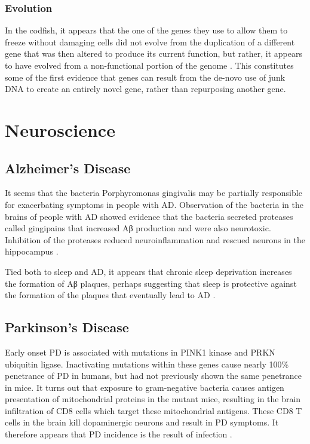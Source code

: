 \documentclass[]{book}
\begin{document}
\subsection{Evolution}\label{evolution}

In the codfish, it appears that the one of the genes they use to allow
them to freeze without damaging cells did not evolve from the
duplication of a different gene that was then altered to produce its
current function, but rather, it appears to have evolved from a
non-functional portion of the genome \citep{baalsrud2017novo}. This
constitutes some of the first evidence that genes can result from the
de-novo use of junk DNA to create an entirely novel gene, rather than
repurposing another gene.

\chapter{Neuroscience}\label{neurosci}

\section{Alzheimer's Disease}\label{alzheimers-disease}

It seems that the bacteria Porphyromonas gingivalis may be partially
responsible for exacerbating symptoms in people with AD. Observation of
the bacteria in the brains of people with AD showed evidence that the
bacteria secreted proteases called gingipains that increased Aβ
production and were also neurotoxic. Inhibition of the proteases reduced
neuroinflammation and rescued neurons in the hippocampus
\citep{dominy2019porphyromonas}.

Tied both to sleep and AD, it appears that chronic sleep deprivation
increases the formation of Aβ plaques, perhaps suggesting that sleep is
protective against the formation of the plaques that eventually lead to
AD \citep{Holth2019-cd}.

\section{Parkinson's Disease}\label{parkinsons-disease}

Early onset PD is associated with mutations in PINK1 kinase and PRKN
ubiquitin ligase. Inactivating mutations within these genes cause nearly
100\% penetrance of PD in humans, but had not previously shown the same
penetrance in mice. It turns out that exposure to gram-negative bacteria
causes antigen presentation of mitochondrial proteins in the mutant
mice, resulting in the brain infiltration of CD8 cells which target
these mitochondrial antigens. These CD8 T cells in the brain kill
dopaminergic neurons and result in PD symptoms. It therefore appears
that PD incidence is the result of infection
\citep{matheoud2019intestinal}.
\end{document}
